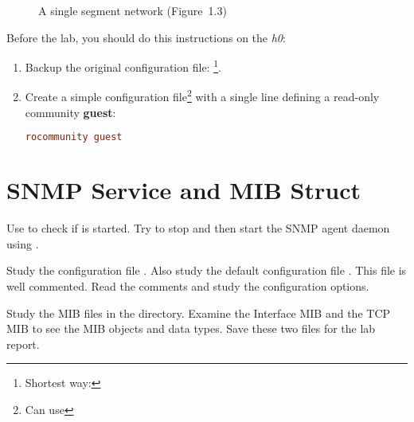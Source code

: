 \documentclass{../UTNetLab}
\begin{document}
\begin{center}
\begin{minipage}{0.48\textwidth}
\begin{flushright}
\begin{figure}[H]
                \caption{A single segment network (Figure~1.3)}\label{fig:1.3}
            \end{figure}
        \end{flushright}
    \end{minipage}
\end{center}

Before the lab, you should do this instructions on the \textit{h0}:
\begin{enumerate}
    \item Backup the original  configuration file:
          \footnote{Shortest way: }.
    \item Create a simple configuration file\footnote{Can use }  with a single line defining a read-only community \textbf{guest}:
          \begin{lstlisting}[language={conf}, emph={guest},morekeywords={[3]rocommunity}]
rocommunity guest
        \end{lstlisting}
\end{enumerate}

\section{SNMP Service and MIB Struct}
Use  to check if  is started.
Try to stop and then start the SNMP agent daemon using .

Study the  configuration file .
Also study the default configuration file .
This file is well commented.
Read the comments and study the configuration options.

Study the MIB files in the  directory.
Examine the Interface MIB  and the TCP MIB  to see the MIB objects and data types.
Save these two files for the lab report.
\end{document}
